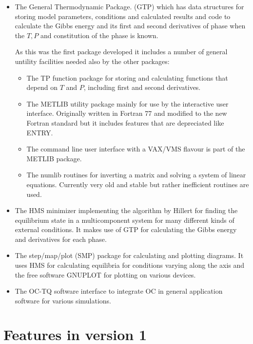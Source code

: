 \documentclass[12pt]{article}
\begin{document}
\begin{itemize}
\item The General Thermodynamic Package. (GTP) which has data
  structures for storing model parameters, conditions and calculated
  results and code to calculate the Gibbs energy and its first and
  second derivatives of phase when the $T, P$ and constitution of the
  phase is known.

  As this was the first package developed it includes a number of
  general untility facilities needed also by the other packages:

\begin{itemize}
\item The TP function package for storing and calculating functions
  that depend on $T$ and $P$, including first and second derivatives.
\item The METLIB utility package mainly for use by the interactive
  user interface. Originally written in Fortran 77 and modified to the
  new Fortran standard but it includes features that are depreciated
  like ENTRY.
\item The command line user interface with a VAX/VMS flavour is part
  of the METLIB package.
\item The numlib routines for inverting a matrix and solving a system
  of linear equations.  Currently very old and stable but rather
  inefficient routines are used.
\end{itemize}

\item The HMS minimizer implementing the algorithm by
  Hillert\cite{81Hil} for finding the equilibrium state in a
  multicomponent system for many different kinds of external
  conditions.  It makes use of GTP for calculating the Gibbs energy
  and derivatives for each phase.

\item The step/map/plot (SMP) package for calculating and plotting
  diagrams.  It uses HMS for calculating equilibria for conditions
  varying along the axis and the free software GNUPLOT for plotting on
  various devices.

\item The OC-TQ software interface to integrate OC in general
  application software for various simulations.

\end{itemize}

\section{Features in version 1}
\end{document}
